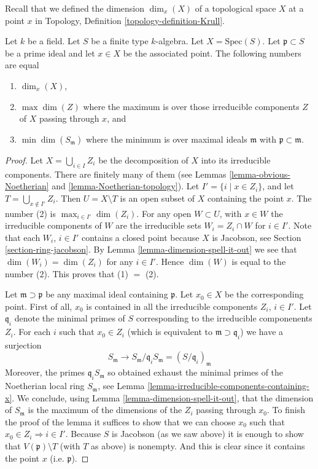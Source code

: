 \noindent
Recall that we defined the
dimension $\dim_x(X)$ of a topological space $X$ at a point $x$
in Topology, Definition \ref{topology-definition-Krull}.

\begin{lemma}
\label{lemma-dimension-at-a-point-finite-type-over-field}
Let $k$ be a field.
Let $S$ be a finite type $k$-algebra.
Let $X = \text{Spec}(S)$.
Let $\mathfrak p \subset S$ be a prime ideal and let
$x \in X$ be the associated point.
The following numbers are equal
\begin{enumerate}
\item $\dim_x(X)$,
\item $\max \dim(Z)$ where the maximum is over those
irreducible components $Z$ of $X$ passing through $x$, and
\item $\min \dim(S_{\mathfrak m})$ where the minimum
is over maximal ideals $\mathfrak m$ with
$\mathfrak p \subset \mathfrak m$.
\end{enumerate}
\end{lemma}

\begin{proof}
Let $X = \bigcup_{i \in I} Z_i$ be the decomposition of $X$ into
its irreducible components. There are finitely many of
them (see
Lemmas \ref{lemma-obvious-Noetherian} and \ref{lemma-Noetherian-topology}).
Let $I' = \{i \mid x \in Z_i\}$, and let
$T = \bigcup_{x \not \in I'} Z_i$. Then $U = X \setminus T$
is an open subset of $X$ containing the point $x$.
The number (2) is $\max_{i \in I'} \dim(Z_i)$.
For any open $W \subset U$, with $x \in W$
the irreducible components of $W$ are the irreducible sets
$W_i = Z_i \cap W$ for $i \in I'$.
Note that each $W_i$, $i \in I'$ contains a closed point because
$X$ is Jacobson, see Section \ref{section-ring-jacobson}.
By Lemma \ref{lemma-dimension-spell-it-out} we see that
$\dim(W_i) = \dim(Z_i)$ for any $i \in I'$. Hence $\dim(W)$
is equal to the number (2). This proves that (1) $ = $ (2).

\medskip\noindent
Let $\mathfrak m \supset \mathfrak p$ be any maximal ideal
containing $\mathfrak p$. Let $x_0 \in X$ be the corresponding
point. First of all, $x_0$ is contained in all the
irreducible components $Z_i$, $i \in I'$. Let $\mathfrak q_i$
denote the minimal primes of $S$ corresponding to the
irreducible componenents $Z_i$. For each $i$ such that
$x_0 \in Z_i$ (which is equivalent to $\mathfrak m \supset \mathfrak q_i$)
we have a surjection
$$
S_{\mathfrak m} \longrightarrow
S_\mathfrak m/\mathfrak q_i S_\mathfrak m =(S/\mathfrak q_i)_{\mathfrak m}
$$
Moreover, the primes $\mathfrak q_i S_\mathfrak m$ so obtained
exhaust the minimal
primes of the Noetherian local ring $S_{\mathfrak m}$, see
Lemma \ref{lemma-irreducible-components-containing-x}.
We conclude, using Lemma \ref{lemma-dimension-spell-it-out},
that the dimension of $S_{\mathfrak m}$ is the
maximum of the dimensions of the $Z_i$ passing through $x_0$.
To finish the proof of the lemma it suffices to show that
we can choose $x_0$ such that $x_0 \in Z_i \Rightarrow i \in I'$.
Because $S$ is Jacobson (as we saw above)
it is enough to show that $V(\mathfrak p) \setminus T$
(with $T$ as above) is nonempty. And this is clear since it
contains the point $x$ (i.e. $\mathfrak p$).
\end{proof}

